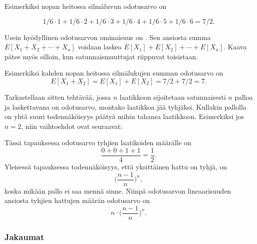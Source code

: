 Esimerkiksi nopan heitossa silmäluvun odotusarvo on

\[1/6 \cdot 1 + 1/6 \cdot 2 + 1/6 \cdot 3 + 1/6 \cdot 4 + 1/6 \cdot 5 + 1/6 \cdot 6 = 7/2.\]

Usein hyödyllinen odotusarvon ominaisuus on .
Sen ansiosta summa $E[X_1+X_2+\cdots+X_n]$ voidaan laskea $E[X_1]+E[X_2]+\cdots+E[X_n]$.
Kaava pätee myös silloin, kun satunnaismuuttujat riippuvat toisistaan.

Esimerkiksi kahden nopan heitossa silmälukujen summan odotusarvo on
\[E[X_1+X_2]=E[X_1]+E[X_2]=7/2+7/2=7.\]

Tarkastellaan sitten tehtävää,
jossa $n$ laatikkoon sijoitetaan
satunnaisesti $n$ palloa
ja laskettavana on odotusarvo,
montako laatikkoa jää tyhjäksi.
Kullakin pallolla on yhtä suuri todennäköisyys
päätyä mihin tahansa laatikkoon.
Esimerkiksi jos $n=2$, niin
vaihtoehdot ovat seuraavat:
\begin{center}
\end{center}
Tässä tapauksessa odotusarvo
tyhjien laatikoiden määrälle on
\[\frac{0+0+1+1}{4} = \frac{1}{2}.\]
Yleisessä tapauksessa
todennäköisyys, että yksittäinen hattu on tyhjä,
on
\[\Big(\frac{n-1}{n}\Big)^n,\]
koska mikään pallo ei saa mennä sinne.
Niinpä odotusarvon lineaarisuuden ansiosta tyhjien hattujen
määrän odotusarvo on
\[n \cdot \Big(\frac{n-1}{n}\Big)^n.\]

\subsubsection{Jakaumat}


